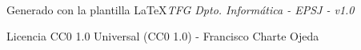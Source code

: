 \documentclass[12pt, a4paper, twoside]{report}   %
\begin{document}
    \Portada~			



    \cleardoublepage
    \tableofcontents  %


    \clearpage\thispagestyle{empty}\cleardoublepage
    \listoffigures		%

    \clearpage\thispagestyle{empty}\cleardoublepage
    \listoftables 		%

    \clearpage\thispagestyle{empty}\cleardoublepage
    \listofalgorithms
    
    \clearpage\thispagestyle{empty}\cleardoublepage
    \lstlistoflistings		%
          
    \clearpage\thispagestyle{empty}\cleardoublepage


  
\clearpage\thispagestyle{empty}\cleardoublepage


\clearpage\thispagestyle{empty}\cleardoublepage


\clearpage\thispagestyle{empty}\cleardoublepage


\clearpage\thispagestyle{empty}\cleardoublepage


\clearpage\thispagestyle{empty}\cleardoublepage


\clearpage\thispagestyle{empty}\cleardoublepage





\clearpage\thispagestyle{empty}
\begin{center}
{\color{flashwhite} Generado con la plantilla \LaTeX \textit{TFG Dpto. Informática - EPSJ - v1.0} \par Licencia CC0 1.0 Universal (CC0 1.0) - Francisco Charte Ojeda}
\end{center}
\end{document}
